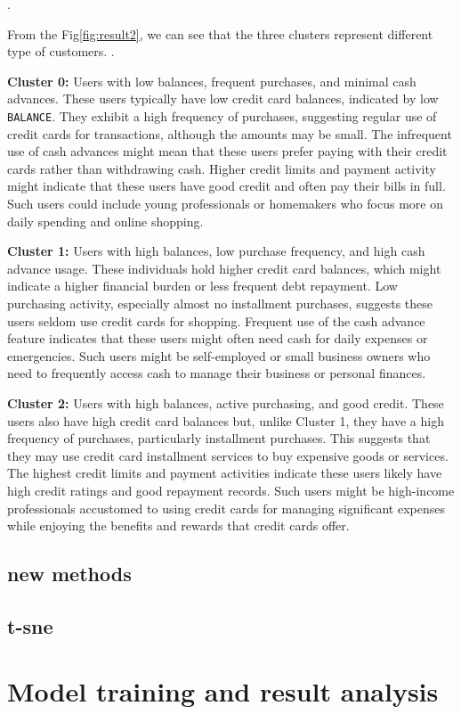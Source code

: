 \documentclass{article}
\begin{document}
.\par
From the Fig\ref{fig:result2}, we can see that the three clusters represent different type of customers.
.\par
\textbf{Cluster 0:} Users with low balances, frequent purchases, and minimal cash advances. These users typically have low credit card balances, indicated by low \texttt{BALANCE}. They exhibit a high frequency of purchases, suggesting regular use of credit cards for transactions, although the amounts may be small. The infrequent use of cash advances might mean that these users prefer paying with their credit cards rather than withdrawing cash. Higher credit limits and payment activity might indicate that these users have good credit and often pay their bills in full. Such users could include young professionals or homemakers who focus more on daily spending and online shopping.

\textbf{Cluster 1:} Users with high balances, low purchase frequency, and high cash advance usage. These individuals hold higher credit card balances, which might indicate a higher financial burden or less frequent debt repayment. Low purchasing activity, especially almost no installment purchases, suggests these users seldom use credit cards for shopping. Frequent use of the cash advance feature indicates that these users might often need cash for daily expenses or emergencies. Such users might be self-employed or small business owners who need to frequently access cash to manage their business or personal finances.

\textbf{Cluster 2:} Users with high balances, active purchasing, and good credit. These users also have high credit card balances but, unlike Cluster 1, they have a high frequency of purchases, particularly installment purchases. This suggests that they may use credit card installment services to buy expensive goods or services. The highest credit limits and payment activities indicate these users likely have high credit ratings and good repayment records. Such users might be high-income professionals accustomed to using credit cards for managing significant expenses while enjoying the benefits and rewards that credit cards offer.

\subsection{new methods}
\subsection{t-sne}
\section{Model training and result analysis}
\subsection{}
\end{document}
